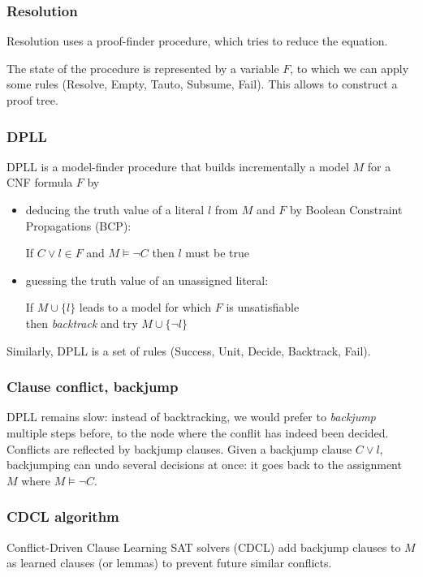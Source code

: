 \documentclass[toc]{../cs-classes/cs-classes}
\begin{document}
\subsubsection{Resolution}
Resolution uses a proof-finder procedure, which tries to reduce the equation.

The state of the procedure is represented by a variable $F$, to which we can apply some rules (Resolve, Empty, Tauto, Subsume, Fail). This allows to construct a proof tree.

\subsubsection{DPLL}
DPLL is a model-finder procedure that builds incrementally a model $M$ for a CNF formula $F$ by
\begin{itemize}
    \item deducing the truth value of a literal $l$ from $M$ and $F$ by Boolean Constraint Propagations (BCP):
    \begin{center}
        If $C\lor l\in F$ and $M\vDash \lnot C$ then $l$ must be true
    \end{center}
    \item guessing the truth value of an unassigned literal:
    \begin{center}
        If $M\cup\{l\}$ leads to a model for which $F$ is unsatisfiable\\ then \emph{backtrack} and try $M\cup\{\lnot l\}$
    \end{center}
\end{itemize}

Similarly, DPLL is a set of rules (Success, Unit, Decide, Backtrack, Fail).

\subsubsection{Clause conflict, backjump}
DPLL remains slow: instead of backtracking, we would prefer to \emph{backjump} multiple steps before, to the node where the conflit has indeed been decided. Conflicts are reflected by backjump clauses. Given a backjump clause $C\lor l$, backjumping can undo several decisions at once: it goes back to the assignment $M$ where $M \vDash \lnot C$.

\subsubsection{CDCL algorithm}
Conflict-Driven Clause Learning SAT solvers (CDCL) add backjump clauses to $M$ as learned clauses (or lemmas) to prevent future similar conflicts. 
\end{document}
